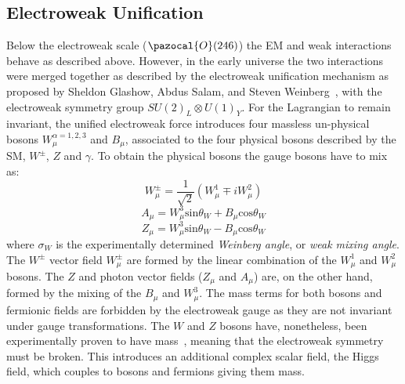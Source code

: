 	\subsection*{Electroweak Unification}
	Below the electroweak scale ($\pazocal{O}(246)$\gev) the \ac{EM} and weak interactions behave as described above. 
	However, in the early universe the two interactions were merged together as described by the electroweak unification mechanism as proposed by Sheldon Glashow, Abdus Salam, and Steven Weinberg~\cite{Glashow:1961tr,SALAM1964168,PhysRevLett.19.1264}, with the electroweak symmetry group $SU(2)_L \otimes U(1)_Y$.
	For the Lagrangian to remain invariant,  the unified electroweak force introduces four massless un-physical bosons $W_{\mu}^{\alpha=1,2,3}$ and $B_{\mu}$, associated to the four physical bosons described by the \ac{SM}, $W^{\pm}$, $Z$ and $\gamma$.
	To obtain the physical bosons the gauge bosons have to mix as:
	\begin{equation}
	W^{\pm}_{\mu}=\frac{1}{\sqrt{2}}\left( W_{\mu}^1\mp iW_{\mu}^2 \right)
	\end{equation}
	\begin{equation}
	A_{\mu}=W^3_{\mu}\mathrm{sin}\theta_W+B_{\mu}\mathrm{cos}\theta_W
	\end{equation}
	\begin{equation}
	Z_{\mu}=W^3_{\mu}\mathrm{sin}\theta_W-B_{\mu}\mathrm{cos}\theta_W
	\end{equation}
	where $\sigma_W$ is the experimentally determined \textit{Weinberg angle}, or \textit{weak mixing angle}.
	The $W^{\pm}$ vector field $W_{\mu}^{\pm}$ are formed by the linear combination of the $W_{\mu}^1$ and $W_{\mu}^2$ bosons. The $Z$ and photon vector fields ($Z_{\mu}$ and $A_{\mu}$) are, on the other hand, formed by the mixing of the $B_{\mu}$ and $W_{\mu}^3$.
	The mass terms for both bosons and fermionic fields are forbidden by the electroweak gauge as they are not invariant under gauge transformations. The $W$ and $Z$ bosons have, nonetheless, been experimentally proven to have mass~\cite{Pich2012}, meaning that the electroweak symmetry must be broken. This introduces an additional complex scalar field, the Higgs field, which couples to bosons and fermions giving them mass. 
	
